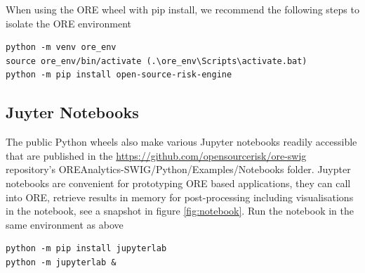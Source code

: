 \documentclass[12pt, a4paper]{report}
\begin{document}
When using the ORE wheel with pip install, we recommend the following steps to isolate the ORE environment
\begin{verbatim}
python -m venv ore_env
source ore_env/bin/activate (.\ore_env\Scripts\activate.bat)
python -m pip install open-source-risk-engine
\end{verbatim}

\subsection*{Juyter Notebooks}

The public Python wheels also make various Jupyter notebooks readily accessible that are published
in the \url{https://github.com/opensourcerisk/ore-swig} repository's
OREAnalytics-SWIG/Python/Examples/Notebooks folder.
Juypter notebooks are convenient for prototyping ORE based applications, they can call into ORE,
retrieve results in memory for post-processing including visualisations in the notebook,
see a snapshot in figure \ref{fig:notebook}. Run the notebook in the same environment as above

\begin{verbatim}
python -m pip install jupyterlab
python -m jupyterlab &
\end{verbatim}
\end{document}
